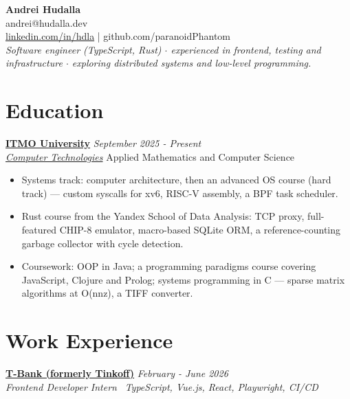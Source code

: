 \documentclass[11pt,a4paper]{article}
\begin{document}
\begin{center}
	{\Huge \textbf{Andrei Hudalla}}\\[0.3em]
  andrei@hudalla.dev \\
	\href{https://www.linkedin.com/in/hdla/}{linkedin.com/in/hdla} | github.com/paranoidPhantom\\[0.5em]
{\itshape Software engineer (TypeScript, Rust) $\cdot$ experienced in frontend, testing and infrastructure $\cdot$ exploring distributed systems and low-level programming.}
\end{center}

\section*{Education}
\noindent\href{https://en.itmo.ru/}{\textbf{ITMO University}} \hfill \textit{September 2025 - Present} \\
\href{https://abit.itmo.ru/en/program/bachelor/programming}{\textit{Computer Technologies}} \hfill Applied Mathematics and Computer Science

\begin{itemize}[leftmargin=*,itemsep=1pt,topsep=2pt,parsep=0pt]
	\item Systems track: computer architecture, then an advanced OS course (hard track) — custom syscalls for xv6, RISC-V assembly, a BPF task scheduler.
	\item Rust course from the Yandex School of Data Analysis: TCP proxy, full-featured CHIP-8 emulator, macro-based SQLite ORM, a reference-counting garbage collector with cycle detection.
	\item Coursework: OOP in Java; a programming paradigms course covering JavaScript, Clojure and Prolog; systems programming in C — sparse matrix algorithms at O(nnz), a TIFF converter.
\end{itemize}

\section*{Work Experience}

\noindent\href{https://www.linkedin.com/company/tinkoff/}{\textbf{T-Bank (formerly Tinkoff)}} \hfill \textit{February - June 2026} \\
\textit{Frontend Developer Intern} \textbullet\ \textit{TypeScript, Vue.js, React, Playwright, CI/CD}
\end{document}
